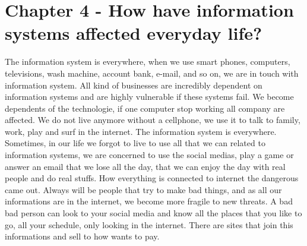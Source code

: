 \documentclass[12pt]{article}
\begin{document}
\section{Chapter 4 - How have information systems affected everyday life?}
The information system is everywhere, when we use smart phones, computers, televisions, wash machine, account bank, e-mail, and so on, we are in touch with information system. All kind of businesses are incredibly dependent on information systems and are highly vulnerable if these systems fail. We become dependents of the technologie, if one computer stop working all company are affected. We do not live anymore without a cellphone, we use it to talk to family, work, play and surf in the internet. The information system is everywhere. Sometimes, in our life we forgot to live to use all that we can related to information systems, we are concerned to use the social medias, play a game or answer an email that we lose all the day, that we can enjoy the day with real people and do real stuffs. How everything is connected to internet the dangerous came out. Always will be people that try to make bad things, and as all our informations are in the internet, we become more fragile to new threats. A bad bad person can look to your social media and know all the places that you like to go, all your schedule, only looking in the internet. There are sites that join this informations and sell to how wants to pay. 
\end{document}
